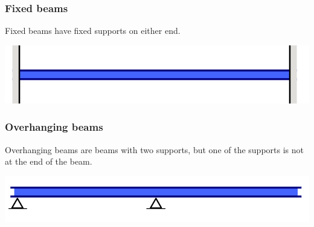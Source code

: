 \documentclass[11pt]{article}
\begin{document}
\subsubsection{Fixed beams}
\label{sec:orgd6e6e4b}
Fixed beams have fixed supports on either end.
\begin{center}
\includegraphics[width=.9\linewidth]{./images/fixed-beam-type.png}
\end{center}

\subsubsection{Overhanging beams}
\label{sec:org0d8bd9b}
Overhanging beams are beams with two supports, but one of the supports is not at the end of the beam.
\begin{center}
\includegraphics[width=.9\linewidth]{./images/overhanging-beam-type.png}
\end{center}

\newpage
\end{document}

